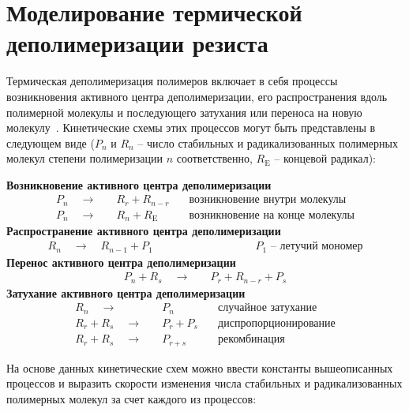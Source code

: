 \section{Моделирование термической деполимеризации резиста} \label{sec:depolymerization}
Термическая деполимеризация полимеров включает в себя процессы возникновения активного центра деполимеризации, его распространения вдоль полимерной молекулы и последующего затухания или переноса на новую молекулу~\cite{Boyd_1}. Кинетические схемы этих процессов могут быть представлены в следующем виде ($P_n$ и $R_n$ -- число стабильных и радикализованных полимерных молекул степени полимеризации $n$ соответственно, $R_\mathrm{E}$ -- концевой радикал):

\begin{center}
	\textbf{Возникновение активного центра деполимеризации}
	\begin{align*}
		P_n \quad \rightarrow \quad & R_r + R_{n-r} \quad & \text{возникновение внутри молекулы} \\
		P_n \quad \rightarrow \quad & R_n + R_\mathrm{E} \quad & \text{возникновение на конце молекулы}
	\end{align*}
	\textbf{Распространение активного центра деполимеризации}
	\begin{align*}
		R_n \quad \rightarrow \quad  R_{n-1} + P_1 \qquad\qquad\qquad\qquad\quad\; \text{$P_1$ -- летучий мономер}
	\end{align*}
	\textbf{Перенос активного центра деполимеризации}
	\begin{align*}
		P_n + R_s \quad \rightarrow \quad & P_r + R_{n-r} + P_s
	\end{align*}
	\textbf{Затухание активного центра деполимеризации}
	\begin{align*}
		R_n \quad \rightarrow \quad & P_n \quad & \text{случайное затухание} \\
		R_r + R_s \quad \rightarrow \quad & P_r + P_s \quad & \text{диспропорционирование} \\
		R_r + R_s \quad \rightarrow \quad & P_{r + s} \quad & \text{рекомбинация}
	\end{align*}
\end{center}
На основе данных кинетические схем можно ввести константы вышеописанных процессов и выразить скорости изменения числа стабильных и радикализованных полимерных молекул за счет каждого из процессов:

